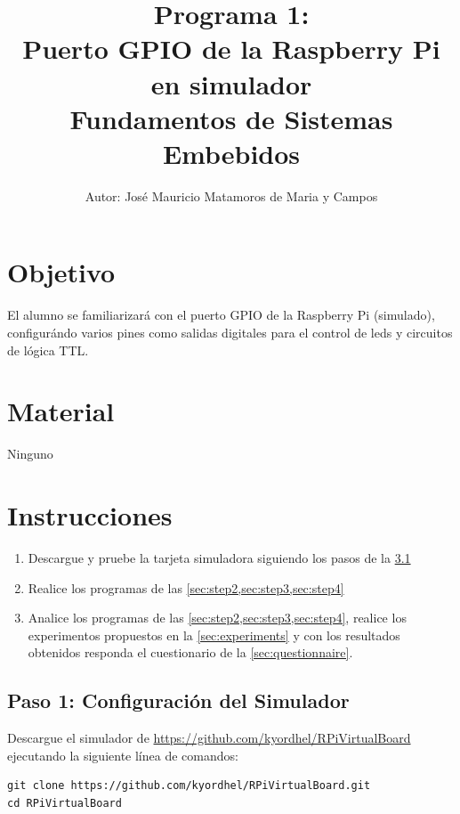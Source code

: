 \documentclass[letterpaper,10.5pt]{article}
\author{\footnotesize Autor: José Mauricio Matamoros de Maria y Campos}
\title{Programa 1:\\Puerto GPIO de la Raspberry Pi en simulador\\
{\large Fundamentos de Sistemas Embebidos}}
\date{}
\begin{document}
\maketitle

\section{Objetivo}%
\label{sec:objective}
El alumno se familiarizará con el puerto GPIO de la Raspberry Pi (simulado), configurándo varios pines como salidas digitales para el control de leds y circuitos de lógica TTL.%

\section{Material}%
\label{sec:material}
Ninguno



\section{Instrucciones}%
\label{sec:instructions}
\begin{enumerate}[noitemsep]
	\item Descargue y pruebe la tarjeta simuladora siguiendo los pasos de la \cref{sec:step1}
	\item Realice los programas de las \cref{sec:step2,sec:step3,sec:step4}
	\item Analice los programas de las \cref{sec:step2,sec:step3,sec:step4}, realice los experimentos propuestos en la \cref{sec:experiments} y con los resultados obtenidos responda el cuestionario de la \cref{sec:questionnaire}.
\end{enumerate}

%
%
\subsection{Paso 1: Configuración del Simulador}%
\label{sec:step1}

Descargue el simulador de \url{https://github.com/kyordhel/RPiVirtualBoard} ejecutando la siguiente línea de comandos:

\begin{Verbatim}[fontsize=\footnotesize]
git clone https://github.com/kyordhel/RPiVirtualBoard.git
cd RPiVirtualBoard
\end{Verbatim}
\end{document}
